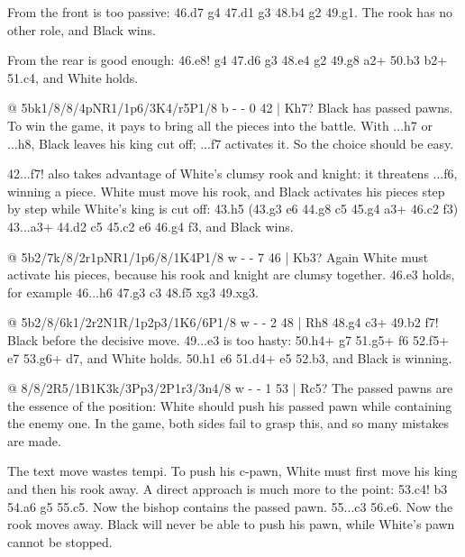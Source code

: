 From the front is too passive: 46.\R d7 g4 47.\R d1 g3 48.\K b4 g2 49.\R g1. The rook has no other role, and Black wins.

From the rear is good enough: 46.\R e8! g4 47.\N d6 g3 48.\N e4 g2 49.\R g8 \R a2+ 50.\K b3 \R b2+ 51.\K c4, and White holds.

@ 5bk1/8/8/4pNR1/1p6/3K4/r5P1/8 b - - 0 42 | Kh7?
Black has passed pawns. To win the game, it pays to bring all the pieces into the battle. With ...\K h7 or ...\K h8, Black leaves his king cut off; ...\K f7 activates it. So the choice should be easy.

42...\K f7! also takes advantage of White's clumsy rook and knight: it threatens ...\K f6, winning a piece. White must move his rook, and Black activates his pieces step by step while White's king is cut off: 43.\R h5 (43.\R g3 \K e6 44.\R g8 \B c5 45.g4 \R a3+ 46.\K c2 \R f3) 43...\R a3+ 44.\K d2 \B c5 45.\K c2 \K e6 46.g4 \R f3, and Black wins.

@ 5b2/7k/8/2r1pNR1/1p6/8/1K4P1/8 w - - 7 46 | Kb3?
Again White must activate his pieces, because his rook and knight are clumsy together. 46.\N e3 holds, for example 46...\B h6 47.\R g3 \R c3 48.\N f5 \R xg3 49.\N xg3.

@ 5b2/8/6k1/2r2N1R/1p2p3/1K6/6P1/8 w - - 2 48 | Rh8
48.g4 \R c3+ 49.\K b2 \K f7! Black  before the decisive move. 49...e3 is too hasty: 50.\N h4+ \K g7 51.\R g5+ \K f6 52.\R f5+ \K e7 53.\N g6+ \K d7, and White holds. 50.\R h1 \K e6 51.\N d4+ \K e5 52.\N b3, and Black is winning.

@ 8/8/2R5/1B1K3k/3Pp3/2P1r3/3n4/8 w - - 1 53 | Rc5?
The passed pawns are the essence of the position: White should push his passed pawn while containing the enemy one. In the game, both sides fail to grasp this, and so many mistakes are made.

The text move wastes tempi. To push his c-pawn, White must first move his king and then his rook away. A direct approach is much more to the point: 53.c4! \R b3 54.\B a6 \K g5 55.c5. Now the bishop contains the passed pawn. 55...\R c3 56.\R e6. Now the rook moves away. Black will never be able to push his pawn, while White's pawn cannot be stopped.

